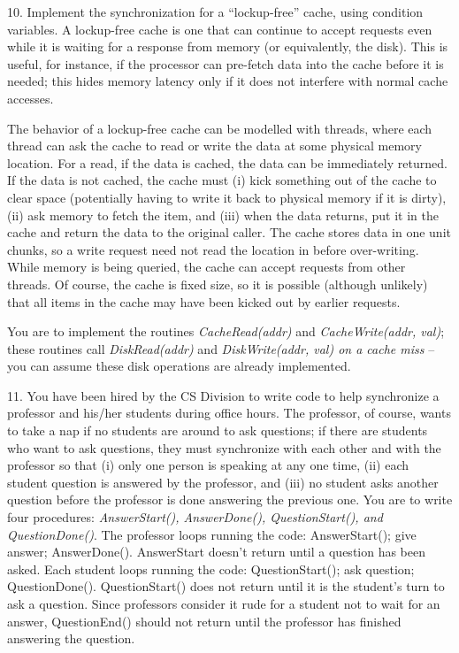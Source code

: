 \begin{description}
\item{10.} Implement the synchronization for
a ``lockup-free'' cache, using condition variables.
A lockup-free cache is one that can continue to accept requests
even while it is waiting for a response from memory (or equivalently, the
disk).  This is useful, for instance, if the processor can pre-fetch data
into the cache before it is needed; this hides memory latency
only if it does not interfere with normal cache accesses.

The behavior of a lockup-free cache can be modelled with threads,
where each thread can ask the cache to read or write the data at
some physical memory location.  For a read, if the data is cached,
the data can be immediately returned.  If the data is not cached,
the cache must (i) kick something out of the cache to clear space
(potentially having to write it back to physical memory if it
is dirty), (ii) ask memory to fetch the item, and (iii) when the
data returns, put it in the cache and return the data to the
original caller.  The cache stores data in one unit chunks, so
a write request need not read the location in before over-writing.
While memory is being queried, the cache can accept requests from
other threads.   Of course, the cache is fixed size, so it is
possible (although unlikely) that all items in the cache may have 
been kicked out by earlier requests.

You are to implement the routines {\em CacheRead(addr)} and
{\em CacheWrite(addr, val)}; these routines call {\em DiskRead(addr)} 
and {\em DiskWrite(addr, val) on a cache miss} -- you can assume
these disk operations are already implemented.

\item{11.} You have been hired by the CS Division to write code to help
synchronize a professor and his/her students during office hours.
The professor, of course, wants to take a nap if no students are around to
ask questions; if there are students who want to ask questions,
they must synchronize with each other and with the professor so that
(i) only one person is speaking at any one time, (ii) each
student question is answered by the professor, and (iii) no student
asks another question before the professor is done answering the previous
one.  You are to write four procedures: {\em AnswerStart(), AnswerDone(),
QuestionStart(), and QuestionDone()}.
The professor loops running the code: AnswerStart(); give answer; AnswerDone().
AnswerStart doesn't return until a question has been asked.
Each student loops running the code: QuestionStart(); ask question; 
QuestionDone().  QuestionStart() does not return until it is the student's 
turn to ask a question.   Since professors consider it rude for a student
not to wait for an answer, QuestionEnd() should not return until the
professor has finished answering the question.


\end{description}
